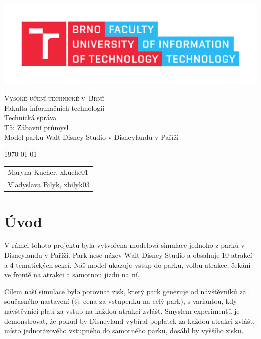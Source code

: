 \documentclass[a4paper,12pt]{article}
\begin{document}
\begin{center}
\includegraphics[width=1.0\textwidth]{fit.pdf} %

    \vspace{0.5cm} 
\Huge
\textsc{Vysoké učení technické v~Brně\\
}Fakulta informačních technologií\\
\Huge Technická správa \\
\LARGE T5: Zábavní průmysl \\
\LARGE  Model parku Walt Disney Studio v Disneylandu v Paříži\\

\Large 


\end{center}
{\Large \today \hfill
\begin{tabular}{l}
    Maryna Kucher, xkuche01 \\
    Vladyslava Bilyk, xbilyk03
\end{tabular}}
\thispagestyle{empty}

\newpage
\tableofcontents
\newpage

\section{Úvod}
V rámci tohoto projektu byla vytvořena modelová simulace jednoho z parků v Disneylandu v Paříži. Park nese název Walt Disney Studio a obsahuje 10 atrakcí a 4 tematických sekcí. Náš model ukazuje vstup do parku, volbu atrakce, čekání ve frontě na atrakci a samotnou jízdu na ní.

Cílem naší simulace bylo porovnat zisk, který park generuje od návštěvníků za současného nastavení (tj. cena za vstupenku na celý park), s variantou, kdy návštěvníci platí za vstup na každou atrakci zvlášť. Smyslem experimentů je demonstrovat, že pokud by Disneyland vybíral poplatek za každou atrakci zvlášť, místo jednorázového vstupného do samotného parku, dosáhl by vyššího zisku.
\end{document}
